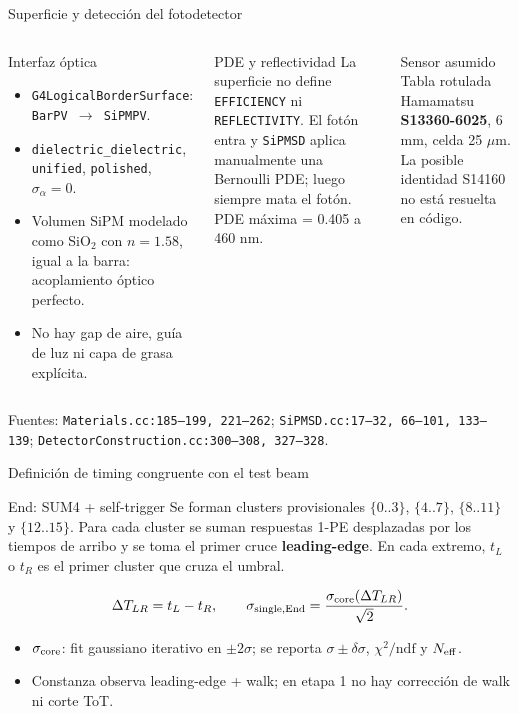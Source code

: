 \documentclass[aspectratio=169]{beamer}
\begin{document}
\begin{frame}{Superficie y detección del fotodetector}
  \small
  \begin{columns}[T]
    \begin{block}{Interfaz óptica}
      \begin{itemize}
        \item \texttt{G4LogicalBorderSurface}: \texttt{BarPV $\to$ SiPMPV}.
        \item \texttt{dielectric\_dielectric}, \texttt{unified},
          \texttt{polished}, $\sigma_\alpha=0$.
        \item Volumen SiPM modelado como SiO$_2$ con $n=1.58$, igual a la
          barra: acoplamiento óptico perfecto.
        \item No hay gap de aire, guía de luz ni capa de grasa explícita.
      \end{itemize}
    \end{block}
    \begin{alertblock}{PDE y reflectividad}
      La superficie no define \texttt{EFFICIENCY} ni \texttt{REFLECTIVITY}.
      El fotón entra y \texttt{SiPMSD} aplica manualmente una Bernoulli PDE;
      luego siempre mata el fotón. PDE máxima = 0.405 a 460 nm.
    \end{alertblock}
    \begin{block}{Sensor asumido}
      \scriptsize Tabla rotulada Hamamatsu \textbf{S13360-6025}, 6 mm,
      celda 25 $\mu$m. La posible identidad S14160 no está resuelta en código.
    \end{block}
  \end{columns}
  \scriptsize Fuentes: \texttt{Materials.cc:185--199, 221--262};
  \texttt{SiPMSD.cc:17--32, 66--101, 133--139};
  \texttt{DetectorConstruction.cc:300--308, 327--328}.
\end{frame}

\begin{frame}{Definición de timing congruente con el test beam}
  \small
  \begin{block}{End: SUM4 + self-trigger}
    Se forman clusters provisionales $\{0..3\}$, $\{4..7\}$,
    $\{8..11\}$ y $\{12..15\}$. Para cada cluster se suman respuestas 1-PE
    desplazadas por los tiempos de arribo y se toma el primer cruce
    \textbf{leading-edge}. En cada extremo, $t_L$ o $t_R$ es el primer cluster
    que cruza el umbral.
  \end{block}
  \[
    \Delta T_{LR}=t_L-t_R,\qquad
    \sigma_{\rm single,End}=\frac{\sigma_{\rm core}(\Delta T_{LR})}{\sqrt{2}}.
  \]
  \begin{itemize}
    \item $\sigma_{\rm core}$: fit gaussiano iterativo en $\pm2\sigma$;
      se reporta $\sigma\pm\delta\sigma$, $\chi^2/\mathrm{ndf}$ y $N_{\rm eff}$.
    \item Constanza observa leading-edge + walk; en etapa 1 no hay corrección
      de walk ni corte ToT.
  \end{itemize}
\end{frame}
\end{document}

